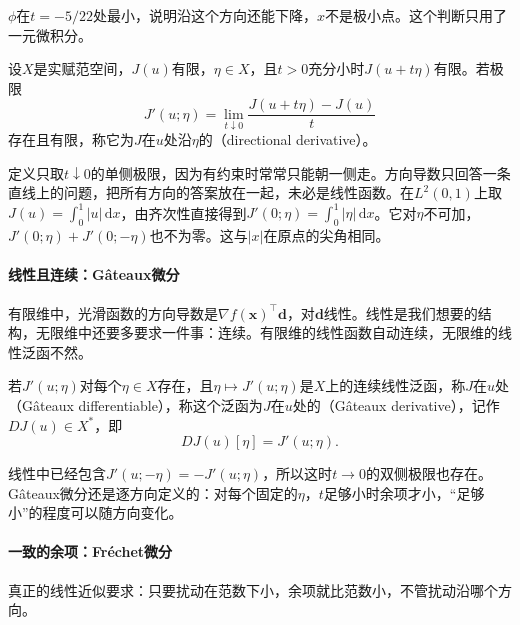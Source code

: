 $\phi$在$t=-5/22$处最小，说明沿这个方向还能下降，$x$不是极小点。这个判断只用了一元微积分。

\begin{definition}[方向导数]
\label{def:func-directional}
设$X$是实赋范空间，$J(u)$有限，$\eta\in X$，且$t>0$充分小时$J(u+t\eta)$有限。若极限
\begin{equation}
 J'(u;\eta)=\lim_{t\downarrow0}\frac{J(u+t\eta)-J(u)}{t}
 \label{eq:func-directional}
\end{equation}
存在且有限，称它为$J$在$u$处沿$\eta$的（directional derivative）。
\end{definition}

定义只取$t\downarrow0$的单侧极限，因为有约束时常常只能朝一侧走。方向导数只回答一条直线上的问题，把所有方向的答案放在一起，未必是线性函数。在$L^2(0,1)$上取$J(u)=\int_0^1\lvert u\rvert\,\mathrm{d}x$，由齐次性直接得到$J'(0;\eta)=\int_0^1\lvert\eta\rvert\,\mathrm{d}x$。它对$\eta$不可加，$J'(0;\eta)+J'(0;-\eta)$也不为零。这与$\lvert x\rvert$在原点的尖角相同。

\paragraph{线性且连续：Gâteaux微分}
有限维中，光滑函数的方向导数是$\nabla f(\bm{x})^\top\bm{d}$，对$\bm{d}$线性。线性是我们想要的结构，无限维中还要多要求一件事：连续。有限维的线性函数自动连续，无限维的线性泛函不然。

\begin{definition}[Gâteaux微分]
\label{def:func-gateaux}
若$J'(u;\eta)$对每个$\eta\in X$存在，且$\eta\mapsto J'(u;\eta)$是$X$上的连续线性泛函，称$J$在$u$处（Gâteaux differentiable），称这个泛函为$J$在$u$处的（Gâteaux derivative），记作$DJ(u)\in X^*$，即
\begin{equation}
 DJ(u)[\eta]=J'(u;\eta).
 \label{eq:func-gateaux}
\end{equation}
\end{definition}

线性中已经包含$J'(u;-\eta)=-J'(u;\eta)$，所以这时$t\to0$的双侧极限也存在。Gâteaux微分还是逐方向定义的：对每个固定的$\eta$，$t$足够小时余项才小，“足够小”的程度可以随方向变化。

\paragraph{一致的余项：Fréchet微分}
真正的线性近似要求：只要扰动在范数下小，余项就比范数小，不管扰动沿哪个方向。

